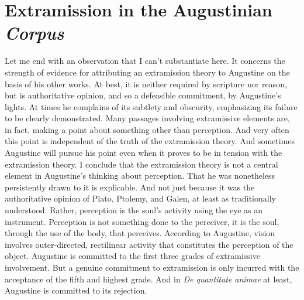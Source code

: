 \documentclass[12pt]{article}
\begin{document}
\section{Extramission in the Augustinian \emph{Corpus}} %
\label{sec:extramission_in_the_augustinian_emph_corpus}

Let me end with an observation that I can't substantiate here. It concerns the strength of evidence for attributing an extramission theory to Augustine on the basis of his other works. At best, it is neither required by scripture nor reason, but is authoritative opinion, and so a defeasible commitment, by Augustine's lights. At times he complains of its subtlety and obscurity, emphasizing its failure to be clearly demonstrated. Many passages involving extramissive elements are, in fact, making a point about something other than perception. And very often this point is independent of the truth of the extramission theory. And sometimes Augustine will pursue his point even when it proves to be in tension with the extramission theory. I conclude that the extramission theory is not a central element in Augustine's thinking about perception. That he was nonetheless persistently drawn to it is explicable. And not just because it was the authoritative opinion of Plato, Ptolemy, and Galen, at least as traditionally understood. Rather, perception is the soul's activity using the eye as an instrument. Perception is not something done to the perceiver, it is the soul, through the use of the body, that perceives. According to Augustine, vision involves outer-directed, rectilinear activity that constitutes the perception of the object. Augustine is committed to the first three grades of extramissive involvement. But a genuine commitment to extramission is only incurred with the acceptance of the fifth and highest grade. And in \emph{De quantitate animae} at least, Augustine is committed to its rejection.

\end{document}
